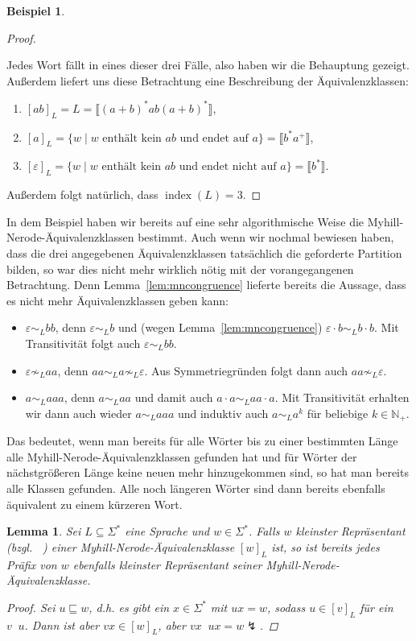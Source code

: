 \documentclass[11pt, a4paper]{article}
\theoremstyle{definition}
\newtheorem{example}[definition]{Beispiel}
\theoremstyle{plain}
\newtheorem{lemma}[definition]{Lemma}
\numberwithin{equation}{section}
\DeclareMathOperator{\ind}{index}
\DeclareMathOperator{\lex}{\prec_\text{lex}}
\begin{document}
\begin{example}
\begin{proof}
\begin{enumerate}[label=\arabic*)]
		\end{enumerate}
		Jedes Wort fällt in eines dieser drei Fälle, also haben wir die Behauptung gezeigt. Außerdem liefert uns diese Betrachtung eine Beschreibung der Äquivalenzklassen:
		\begin{enumerate}[label=\arabic*)]
			\item $[ab]_L = L = \llbracket (a+b)^\ast ab (a+b)^\ast \rrbracket$,
			\item $[a]_L = \{w \mid w \text{ enthält kein } ab \text{ und endet auf } a\} = \llbracket b^\ast a^+ \rrbracket$,
			\item $[\varepsilon]_L = \{w \mid w \text{ enthält kein } ab \text{ und endet nicht auf } a\} = \llbracket b^\ast \rrbracket$.
		\end{enumerate}
		Außerdem folgt natürlich, dass $\ind(L) = 3$.
	\end{proof}
\end{example}
In dem Beispiel haben wir bereits auf eine sehr algorithmische Weise die Myhill-Nerode-Äquivalenzklassen bestimmt. Auch wenn wir nochmal bewiesen haben, dass die drei angegebenen Äquivalenzklassen tatsächlich die geforderte Partition bilden, so war dies nicht mehr wirklich nötig mit der vorangegangenen Betrachtung. Denn Lemma~\ref{lem:mncongruence} lieferte bereits die Aussage, dass es nicht mehr Äquivalenzklassen geben kann:
\begin{itemize}
	\item $\varepsilon \sim_L bb$, denn $\varepsilon \sim_L b$ und (wegen Lemma~\ref{lem:mncongruence}) $\varepsilon \cdot b \sim_L b \cdot b$. Mit Transitivität folgt auch $\varepsilon \sim_L bb$.
	\item $\varepsilon \not\sim_L aa$, denn $aa \sim_L a \not\sim_L \varepsilon$. Aus Symmetriegründen folgt dann auch $aa \not\sim_L \varepsilon$.
	\item $a \sim_L aaa$, denn $a \sim_L aa$ und damit auch $a \cdot a \sim_L aa \cdot a$. Mit Transitivität erhalten wir dann auch wieder $a \sim_L aaa$ und induktiv auch $a \sim_L a^k$ für beliebige $k \in \mathbb{N}_+$.
\end{itemize}
Das bedeutet, wenn man bereits für alle Wörter bis zu einer bestimmten Länge alle Myhill-Nerode-Äquivalenzklassen gefunden hat und für Wörter der nächstgrößeren Länge keine neuen mehr hinzugekommen sind, so hat man bereits alle Klassen gefunden. Alle noch längeren Wörter sind dann bereits ebenfalls äquivalent zu einem kürzeren Wort. 
\begin{lemma}
	Sei $L \subseteq \Sigma^\ast$ eine Sprache und $w \in \Sigma^\ast$. Falls $w$ kleinster Repräsentant (bzgl. $\lex$) einer Myhill-Nerode-Äquivalenzklasse $[w]_L$ ist, so ist bereits jedes Präfix von $w$ ebenfalls kleinster Repräsentant seiner Myhill-Nerode-Äquivalenzklasse.
	\begin{proof}
		Sei $u \sqsubseteq w$, d.h. es gibt ein $x \in \Sigma^\ast$ mit $ux = w$, sodass $u \in [v]_L$ für ein $v \lex u$. Dann ist aber $vx \in [w]_L$, aber $vx \lex ux = w \lightning$.
	\end{proof}
\end{lemma}
\end{document}
